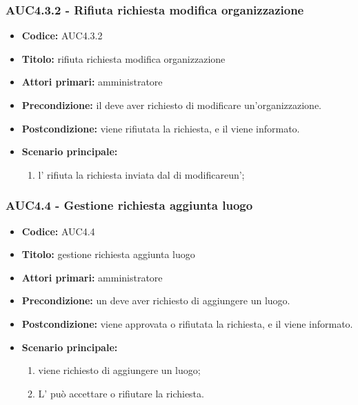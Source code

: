 \documentclass[casi-duso]{subfiles}
\begin{document}
\subsubsection{AUC4.3.2 - Rifiuta richiesta modifica organizzazione}
\label{subsub:AUC4.3.2}
\begin{itemize}
  \item \textbf{Codice:} AUC4.3.2
  \item \textbf{Titolo:} rifiuta richiesta modifica organizzazione
  \item \textbf{Attori primari:} amministratore
  \item \textbf{Precondizione:} il  deve aver richiesto di modificare un'organizzazione.
  \item \textbf{Postcondizione:} viene rifiutata la richiesta, e il  viene informato.
  \item \textbf{Scenario principale:} 
  \begin{enumerate}
    \item l' rifiuta la richiesta inviata dal  di modificareun';
  \end{enumerate}
\end{itemize}

\subsubsection{AUC4.4 - Gestione richiesta aggiunta luogo}
\label{subsub:AUC4.4}
\begin{itemize}
  \item \textbf{Codice:} AUC4.4
  \item \textbf{Titolo:} gestione richiesta aggiunta luogo
  \item \textbf{Attori primari:} amministratore
  \item \textbf{Precondizione:} un  deve aver richiesto di aggiungere un luogo.
  \item \textbf{Postcondizione:} viene approvata o rifiutata la richiesta, e il  viene informato.
  \item \textbf{Scenario principale:} 
  \begin{enumerate}
    \item viene richiesto di aggiungere un luogo;
    \item L' può accettare o rifiutare la richiesta.
  \end{enumerate}
\end{itemize}
\end{document}
